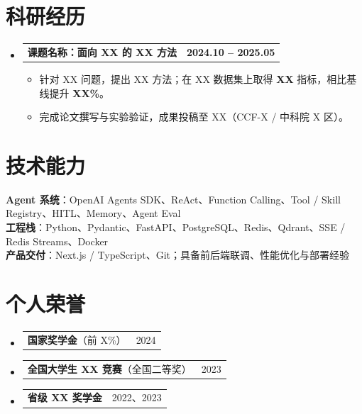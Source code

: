 \documentclass[a4paper,11pt]{article}
\makeatletter
\newcommand{\resumeItem}[1]{
  \item\small{{#1 \vspace{-1pt}}}
}
\newcommand{\resumeResearchHeading}[2]{
  \vspace{-2pt}\item
    \begin{tabular*}{0.97\textwidth}[t]{l@{\extracolsep{\fill}}r}
      \textbf{#1} & \textbf{#2} \\
    \end{tabular*}\vspace{-7pt}
}
\newcommand{\resumeProjectHeading}[2]{
  \item
    \begin{tabular*}{0.97\textwidth}{l@{\extracolsep{\fill}}r}
      \small #1 & #2 \\
    \end{tabular*}\vspace{-7pt}
}
\newcommand{\resumeSubHeadingListStart}{\begin{itemize}[leftmargin=0.15in,label={},itemsep=1pt,topsep=2pt]}
\newcommand{\resumeSubHeadingListEnd}{\end{itemize}}
\newcommand{\resumeItemListStart}{\begin{itemize}[leftmargin=*,label={\small\textbullet},itemsep=0pt,topsep=2pt]}
\newcommand{\resumeItemListEnd}{\end{itemize}\vspace{-2pt}}
\makeatother
\begin{document}
\section{科研经历}
\resumeSubHeadingListStart
  \resumeResearchHeading
    {课题名称：面向 XX 的 XX 方法}{2024.10 -- 2025.05}
  \resumeItemListStart
    \resumeItem{针对 XX 问题，提出 XX 方法；在 XX 数据集上取得 \textbf{XX} 指标，相比基线提升 \textbf{XX\%}。}
    \resumeItem{完成论文撰写与实验验证，成果投稿至 XX（CCF-X / 中科院 X 区）。}
  \resumeItemListEnd
\resumeSubHeadingListEnd

\section{技术能力}
\begin{itemize}[leftmargin=0.15in,label={},topsep=2pt,itemsep=0pt]
  \small{\item{
    \textbf{Agent 系统}{：OpenAI Agents SDK、ReAct、Function Calling、Tool / Skill Registry、HITL、Memory、Agent Eval} \\
    \textbf{工程栈}{：Python、Pydantic、FastAPI、PostgreSQL、Redis、Qdrant、SSE / Redis Streams、Docker} \\
    \textbf{产品交付}{：Next.js / TypeScript、Git；具备前后端联调、性能优化与部署经验}
  }}
\end{itemize}

\section{个人荣誉}
\resumeSubHeadingListStart
  \resumeProjectHeading
    {\textbf{国家奖学金}（前 X\%）}{2024}
  \resumeProjectHeading
    {\textbf{全国大学生 XX 竞赛}（全国二等奖）}{2023}
  \resumeProjectHeading
    {\textbf{省级 XX 奖学金}}{2022、2023}
\resumeSubHeadingListEnd
\end{document}
